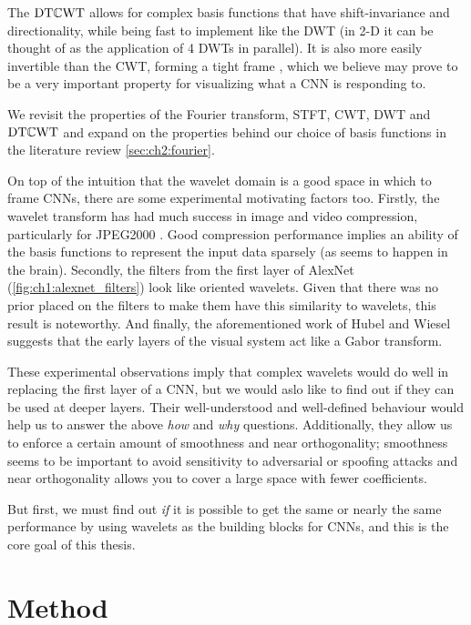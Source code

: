 The $\mathrm{DT}\mathbb{C}\mathrm{WT}$ allows for complex basis functions that have shift-invariance and
directionality, while being fast to implement like the DWT (in 2-D it can be thought of as the
application of 4 DWTs in parallel). It is also more easily invertible than the
CWT, forming a tight frame \cite{kovacevic_introduction_2008}, which we believe
may prove to be a very important property for visualizing what a
CNN is responding to.

We revisit the properties of the Fourier transform, STFT, CWT, DWT and $\mathrm{DT}\mathbb{C}\mathrm{WT}$
and expand on the properties behind our choice of basis functions
in the literature review \autoref{sec:ch2:fourier}.

On top of the intuition that the wavelet domain is a good space in which to frame CNNs,
there are some experimental motivating factors too. Firstly, the wavelet
transform has had much success in image and video compression, particularly for
JPEG2000 \cite{taubman_jpeg2000_2013}. Good compression performance implies an ability of
the basis functions to represent the input data sparsely (as seems to happen in
the brain). Secondly, the filters from the first layer of AlexNet
(\autoref{fig:ch1:alexnet_filters}) look like oriented wavelets. Given that
there was no prior placed on the filters to make them have this similarity to
wavelets, this result is noteworthy. And finally, the aforementioned work of
Hubel and Wiesel suggests that the early layers of the visual system act like a
Gabor transform.

These experimental observations imply that complex wavelets would do well in
replacing the first layer of a CNN, but we would aslo like to find out if they can be used
at deeper layers. Their well-understood and well-defined behaviour would help us
to answer the above \emph{how} and \emph{why} questions. Additionally, they
allow us to enforce a certain amount of smoothness and near orthogonality;
smoothness seems to be important to avoid sensitivity to adversarial or spoofing
attacks \cite{szegedy_intriguing_2014} and near orthogonality allows you to
cover a large space with fewer coefficients.

But first, we must find out \emph{if} it is possible to get the same or nearly the same
performance by using wavelets as the building blocks for CNNs, and this is the
core goal of this thesis.

\section{Method}
